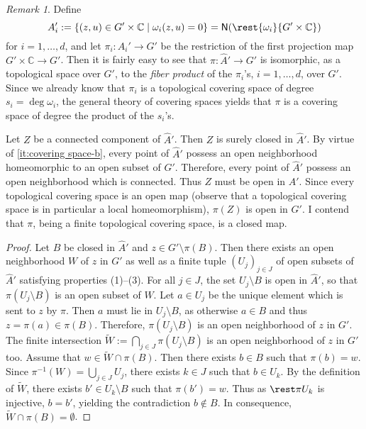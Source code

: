 \documentclass[a4paper]{amsart}
\newcommand{\C}{\mathbb{C}}
\newcommand{\Zero}[1]{\mathsf{N}(#1)}
\theoremstyle{remark}
\newtheorem{remark}{Remark}[question]
\numberwithin{equation}{question}
\DeclarePairedDelimiter\set{\{}{\}}
\begin{document}
\begin{solution}
\begin{solenum}
\begin{remark}
Define
\[
A_i' := \set{(z,u) \in G' \times \C \mid \omega_i(z,u) = 0} = \Zero{\rest{\omega_i}{G' \times \C}}
\]
for $i = 1,\dots,d$, and let $\pi_i \colon A_i' \to G'$ be the restriction of the first projection map $G' \times \C \to G'$. Then it is fairly easy to see that $\pi \colon \hat A' \to G'$ is isomorphic, as a topological space over $G'$, to the \emph{fiber product} of the $\pi_i$'s, $i=1,\dots,d$, over $G'$. Since we already know that $\pi_i$ is a topological covering space of degree $s_i = \deg\omega_i$, the general theory of covering spaces yields that $\pi$ is a covering space of degree the product of the $s_i$'s.
\end{remark}

\item Let $Z$ be a connected component of $\hat A'$. Then $Z$ is surely closed in $\hat A'$. By virtue of \cref{it:covering space-b}, every point of $\hat A'$ possess an open neighborhood homeomorphic to an open subset of $G'$. Therefore, every point of $\hat A'$ possess an open neighborhood which is connected. Thus $Z$ must be open in $\hat A'$. Since every topological covering space is an open map (observe that a topological covering space is in particular a local homeomorphism), $\pi(Z)$ is open in $G'$.
I contend that $\pi$, being a finite topological covering space, is a closed map.
\begin{proof}
Let $B$ be closed in $\hat A'$ and $z \in G' \setminus \pi(B)$. Then there exists an open neighborhood $W$ of $z$ in $G'$ as well as a finite tuple $(U_j)_{j \in J}$ of open subsets of $\hat A'$ satisfying properties (1)--(3). For all $j \in J$, the set $U_j \setminus B$ is open in $\hat A'$, so that $\pi(U_j \setminus B)$ is an open subset of $W$. Let $a \in U_j$ be the unique element which is sent to $z$ by $\pi$. Then $a$ must lie in $U_j \setminus B$, as otherwise $a \in B$ and thus $z = \pi(a) \in \pi(B)$. Therefore, $\pi(U_j \setminus B)$ is an open neighborhood of $z$ in $G'$. The finite intersection $\tilde W := \bigcap_{j \in J} \pi(U_j \setminus B)$ is an open neighborhood of $z$ in $G'$ too. Assume that $w \in \tilde W \cap \pi(B)$. Then there exists $b \in B$ such that $\pi(b) = w$. Since $\pi^{-1}(W) = \bigcup_{j \in J} U_j$, there exists $k \in J$ such that $b \in U_k$. By the definition of $\tilde W$, there exists $b' \in U_k \setminus B$ such that $\pi(b') = w$. Thus as $\rest\pi{U_k}$ is injective, $b = b'$, yielding the contradiction $b \notin B$. In consequence, $\tilde W \cap \pi(B) = \emptyset$.
\end{proof}


\end{solenum}
\end{solution}
\end{document}
